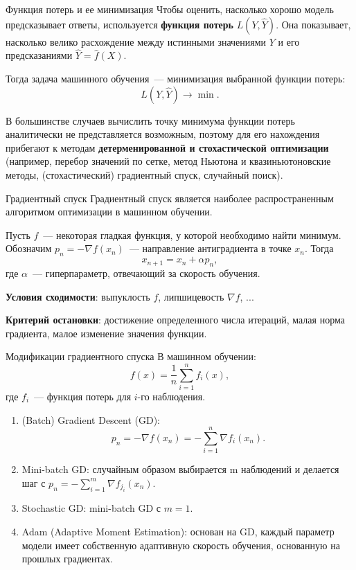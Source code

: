 \documentclass[notheorems, handout]{beamer}
\begin{document}
\begin{frame}{Функция потерь и ее минимизация}
	Чтобы оценить, насколько хорошо модель предсказывает ответы, используется {\bf функция потерь} $L(Y, \hat{Y})$. Она показывает, насколько велико расхождение между истинными значениями $Y$ и его предсказаниями $\hat{Y} = \hat{f} (X)$.\bigskip

	Тогда задача машинного обучения~--- минимизация выбранной функции потерь:
	\[
		L(Y, \hat Y)\longrightarrow \min.
	\]\smallskip

	В большинстве случаев вычислить точку минимума функции потерь аналитически не представляется возможным, поэтому для его нахождения прибегают к методам \textbf{детерменированной и стохастической оптимизации} (например, перебор значений по сетке, метод Ньютона и квазиньютоновские методы, (стохастический) градиентный спуск, случайный поиск).
\end{frame}

\begin{frame}{Градиентный спуск}
	Градиентный спуск является наиболее распространенным алгоритмом оптимизации в машинном обучении.\medskip

	Пусть $f$~--- некоторая гладкая функция, у которой необходимо найти минимум. Обозначим $p_n=-\nabla f(x_n)$~--- направление антиградиента в точке $x_n$. Тогда
	\[
		x_{n+1}=x_n+\alpha p_n,
	\]
	где $\alpha$~--- гиперпараметр, отвечающий за скорость обучения.\medskip

	\textbf{Условия сходимости}: выпуклость $f$, липшицевость $\nabla f$, ...\medskip

	\textbf{Критерий остановки}: достижение определенного числа итераций, малая норма градиента, малое изменение значения функции.
\end{frame}

\begin{frame}{Модификации градиентного спуска}
	В машинном обучении:
	\[
		f(x)=\frac{1}{n}\sum_{i=1}^n f_i(x),
	\]
	где $f_i$~--- функция потерь для $i$-го наблюдения.\medskip
	\begin{enumerate}
		\item (Batch) Gradient Descent (GD):
		      \[
			      p_n=-\nabla f(x_n)=-\sum_{i=1}^n \nabla f_i(x_n).
		      \]
		\item Mini-batch GD: случайным образом выбирается \textsf{m} наблюдений и делается шаг с $p_n=-\sum_{i=1}^m \nabla f_{j_i}(x_n)$.\smallskip
		\item Stochastic GD: mini-batch GD с $m=1$.\smallskip
		\item Adam (Adaptive Moment Estimation): основан на GD, каждый параметр модели имеет собственную адаптивную скорость обучения, основанную на прошлых градиентах.
	\end{enumerate}
\end{frame}
\end{document}
